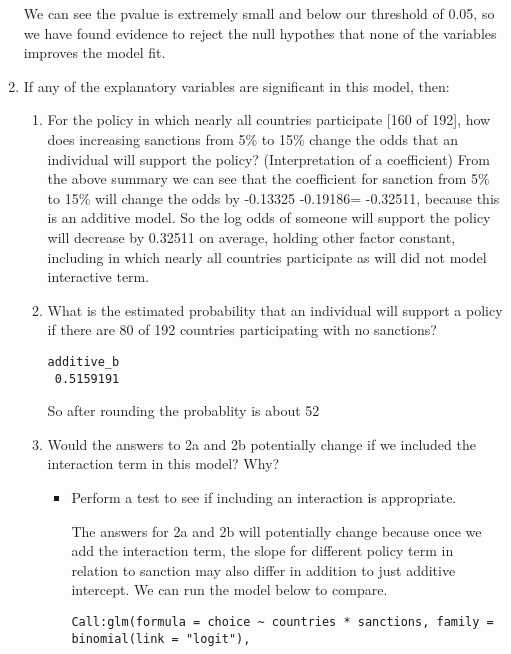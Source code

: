 \documentclass[12pt,letterpaper]{article}
\begin{document}
\begin{enumerate}
\begin{lstlisting}
	\end{lstlisting}
We can see the pvalue is extremely small and below our threshold of 0.05, so we have found evidence to reject the null hypothes that none of the variables improves the model fit.
	\item
	If any of the explanatory variables are significant in this model, then:
	\begin{enumerate}
		\item
		For the policy in which nearly all countries participate [160 of 192], how does increasing sanctions from 5\% to 15\% change the odds that an individual will support the policy? (Interpretation of a coefficient)
From the above  summary we can see that the coefficient for sanction from 5\% to 15\% will  change the odds by  -0.13325  -0.19186=  -0.32511, because this is an additive model.  So the log odds of someone will support the policy will decrease by 0.32511 on average, holding other factor constant, including in which nearly all countries participate as will did not model interactive term.
		\item
		What is the estimated probability that an individual will support a policy if there are 80 of 192 countries participating with no sanctions? 
	 
	\begin{lstlisting}	
additive_b        
 0.5159191			
\end{lstlisting}
So after rounding the probablity is about 52%
		\item
		Would the answers to 2a and 2b potentially change if we included the interaction term in this model? Why? 
		\begin{itemize}
			\item Perform a test to see if including an interaction is appropriate.
	 
The answers for 2a and 2b will potentially change because once we add the interaction term, the slope for different policy term in relation to sanction may also differ in addition to just additive intercept. We can run the model below to compare. 
	 
	\begin{lstlisting}	
Call:glm(formula = choice ~ countries * sanctions, family = binomial(link = "logit"),     

\end{lstlisting}
\end{itemize}
\end{enumerate}
\end{enumerate}
\end{document}
